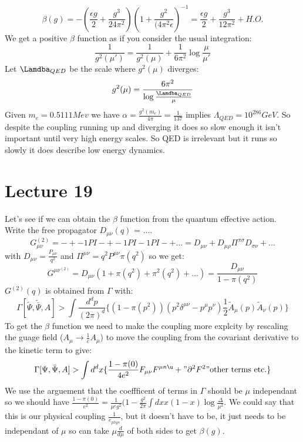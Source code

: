 \documentclass{article}
\begin{document}
$$
 \beta(g) = - ( \frac{\epsilon g}{2} + \frac{g^3}{24 \pi^2}) ( 1+ \frac{g^2}{(4 \pi^2 \epsilon})^{-1} = \frac{\epsilon g}{2} + \frac{g^3 }{12 \pi^2} + H.O.
$$
We get a positive $\beta$ function as if you consider the usual integration:
$$
 \frac{1}{g^2(\mu')} = \frac{1}{g^2( \mu)} + \frac{1}{6 \pi^2} \log \frac{\mu}{\mu'}
$$
Let $\Lamdba_{QED}$ be the scale where $g^2( \mu)$ diverges:
 $$
  g^2(\mu) = \frac{6 \pi^2}{\log \frac{\Lamdba_{QED}}{\mu}}
 $$
 Given $m_e = 0.5111 Mev$ we have $\alpha = \frac{g^2(m_e)}{4 \pi} = \frac{1}{137}$ implies $\Lambda_{QED} = 10^{286} GeV$. So despite the coupling running up and diverging it does so slow enough it isn't important until very high energy scales. So QED is irrelevant but it runs so slowly it does describe low energy dynamics.
 \section{Lecture 19}
 Let's see if we can obtain the $\beta$ function from the quantum effective action.\\
 Write the free propagator $D_{\mu \nu} (q)$ = ....
 $$
  G_{\mu \nu}^{(2)} = - + -1PI- + - 1PI - 1PI - + ... = D_{\mu \nu} + D_{\mu \rho} \Pi^{\pi \sigma} D_{\sigma \nu} + ...
 $$
 with $D_{\mu \nu} = \frac{P_{\mu \nu}}{q^2}$ and $\Pi^{\mu \nu} = q^2 P^{\mu \nu} \pi( q^2)$ so we get:
 $$
 G^{\mu \nu}^{(2)} = D_{\mu \nu} ( 1 +  \pi(q^2) + \pi^2(q^2) + ... ) = \frac{D_{\mu \nu}}{1 - \pi(q^2)}
 $$
 $G^{(2)}(q)$ is obtained from $\Gamma$ with:
 $$
 \Gamma [ \tilde{\Psi}, \tilde{\bar \Psi}, A] > \int \frac{d^dp }{ (2\pi)^d} \{ ( 1- \pi(p^2))(p^2 \delta^{\mu \nu} - p^{\mu} p^{\nu} ) \frac{1}{2} \tilde A_{\mu} (p) \tilde A_{\nu} (p) \}
 $$
 To get the $\beta$ function we need to make the coupling more explcity by rescaling the guage field ($A_{\mu} \rightarrow \frac{1}{e} A_{\mu}$) to move the coupling from the covariant derivative to the kinetic term to give:
 $$
 \Gamma [ \Psi, \bar \Psi, A] > \int d^d x \{ \frac{1- \pi(0)}{4 e^2} F_{\mu \nu} F^{\mu n\u} + "\partial^2 F^2 " \text{other terms etc.}\}
 $$
 We use the arguement that the coeffficent of terms in $\Gamma$ should be $\mu$ independant so we should have $\frac{1 - \pi(0)}{e^2} = \frac{1}{\mu^{\epsilon} g^2} ( 1 - \frac{g^2}{2\pi} \int dx x(1-x) \log \frac{\Delta}{\mu^2}$. We could say that this is our physical coupling $\frac{1}{e_{phys}}$, but it doesn't have to be, it just needs to be independant of $\mu$ so can take $\mu \frac{d}{d\mu}$ of both sides to get $\beta(g)$.\\\\
\end{document}
